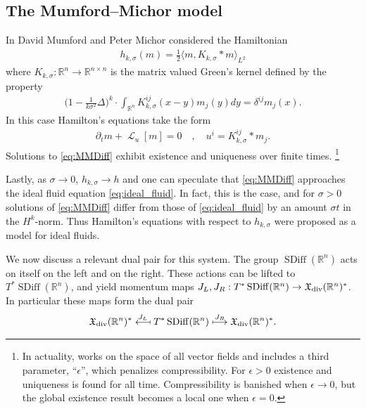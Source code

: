 \documentclass[12pt]{amsart}
\newcommand{\R}{\ensuremath{\mathbb{R}}}
\DeclareMathOperator{\SDiff}{SDiff}
\DeclareMathOperator{\lie}{\mathcal{L}}
\begin{document}
\subsection{The Mumford--Michor model}
\label{sec:MME}
In \cite{MumfordMichor2013} David Mumford and Peter Michor
considered the Hamiltonian
\begin{align*}
  h_{k,\sigma}(m) = \frac{1}{2} \langle m , K_{k,\sigma} * m \rangle_{L^2} 
\end{align*}
where $K_{k,\sigma}:\R^n \to \mathbb{R}^{n \times n}$ is the matrix
valued Green's kernel defined by the property
\begin{align*}
 \Big(1 - \frac{1}{k \sigma^2} \Delta \Big)^k \cdot \int_{\R^n} K_{k,\sigma}^{ij}(x - y) m_j(y) dy = \delta^{ij} m_j(x).
\end{align*}
In this case Hamilton's equations take the form
\begin{align}
	\partial_t m+ \lie_u [ m] = 0 \quad , \quad u^i  = K^{ij}_{k,\sigma} * m_j. \label{eq:MMDiff}
\end{align}
Solutions to \eqref{eq:MMDiff} exhibit existence and uniqueness over finite times.
\footnote{In actuality, \cite{MumfordMichor2013} works on the space of all
vector fields and includes a third parameter, ``$\epsilon$'', which
penalizes compressibility.  For $\epsilon > 0$ existence and uniqueness is found for all time.
Compressibility is banished when $\epsilon \to 0$, but the global existence result becomes a local one
when $\epsilon = 0$.}

Lastly, as $\sigma \to 0$, $h_{k,\sigma} \to h$ and one can speculate that \eqref{eq:MMDiff}
approaches the ideal fluid equation \eqref{eq:ideal_fluid}.
In fact, this is the case, and for $\sigma > 0$ solutions of \eqref{eq:MMDiff}
differ from those of \eqref{eq:ideal_fluid} by an amount $\sigma t$
in the $H^k$-norm.
Thus Hamilton's equations with respect to $h_{k,\sigma}$ were proposed
as a model for ideal fluids.

We now discuss a relevant dual pair for this system.
The group $\SDiff(\R^n)$ acts on itself on the left and on the right.
These actions can be lifted to $T^* \SDiff(\R^n)$, and yield
momentum maps $J_L,J_R : T^*\SDiff(\R^n) \to \mathfrak{X}_{\rm div}(\R^n)^*$. In particular these maps form the dual pair
\begin{align*}
  \mathfrak{X}_{\rm div}(\R^n)^*
  \stackrel{J_L}{\longmapsfrom}
  T^* \SDiff(\R^n)
  \stackrel{J_R}{\longmapsto}
  \mathfrak{X}_{\rm div}(\R^n)^*.
\end{align*}
\end{document}
